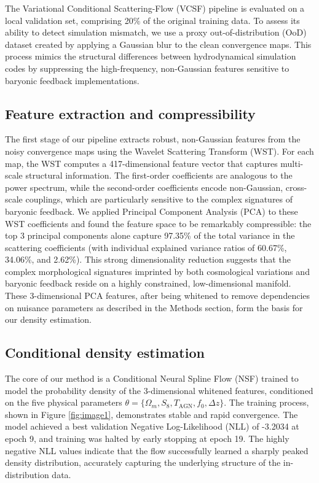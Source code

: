 \documentclass[]{article}
\begin{document}
The Variational Conditional Scattering-Flow (VCSF) pipeline is evaluated on a local validation set, comprising 20\% of the original training data. To assess its ability to detect simulation mismatch, we use a proxy out-of-distribution (OoD) dataset created by applying a Gaussian blur to the clean convergence maps. This process mimics the structural differences between hydrodynamical simulation codes by suppressing the high-frequency, non-Gaussian features sensitive to baryonic feedback implementations.

\subsection{Feature extraction and compressibility}
The first stage of our pipeline extracts robust, non-Gaussian features from the noisy convergence maps using the Wavelet Scattering Transform (WST). For each map, the WST computes a 417-dimensional feature vector that captures multi-scale structural information. The first-order coefficients are analogous to the power spectrum, while the second-order coefficients encode non-Gaussian, cross-scale couplings, which are particularly sensitive to the complex signatures of baryonic feedback. We applied Principal Component Analysis (PCA) to these WST coefficients and found the feature space to be remarkably compressible: the top 3 principal components alone capture 97.35\% of the total variance in the scattering coefficients (with individual explained variance ratios of 60.67\%, 34.06\%, and 2.62\%). This strong dimensionality reduction suggests that the complex morphological signatures imprinted by both cosmological variations and baryonic feedback reside on a highly constrained, low-dimensional manifold. These 3-dimensional PCA features, after being whitened to remove dependencies on nuisance parameters as described in the Methods section, form the basis for our density estimation.

\subsection{Conditional density estimation}
The core of our method is a Conditional Neural Spline Flow (NSF) trained to model the probability density of the 3-dimensional whitened features, conditioned on the five physical parameters $\theta = \{\Omega_m, S_8, T_{\text{AGN}}, f_0, \Delta z\}$. The training process, shown in Figure \ref{fig:image1}, demonstrates stable and rapid convergence. The model achieved a best validation Negative Log-Likelihood (NLL) of -3.2034 at epoch 9, and training was halted by early stopping at epoch 19. The highly negative NLL values indicate that the flow successfully learned a sharply peaked density distribution, accurately capturing the underlying structure of the in-distribution data.
\end{document}
